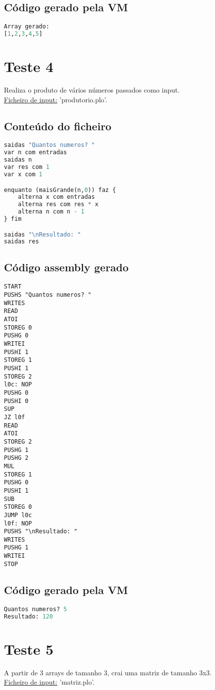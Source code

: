 \documentclass[11pt,a4paper]{report}%
\begin{document}
\subsection{Código gerado pela VM}
\begin{lstlisting}[language=python]
Array gerado:
[1,2,3,4,5]
\end{lstlisting}

\section{Teste 4}
Realiza o produto de vários números passados como input. \\
\underline{Ficheiro de input:} 'produtorio.plo'.

\subsection{Conteúdo do ficheiro}

\begin{lstlisting}[language=python]
saidas "Quantos numeros? "
var n com entradas
saidas n
var res com 1
var x com 1

enquanto (maisGrande(n,0)) faz {
    alterna x com entradas
    alterna res com res * x
    alterna n com n - 1
} fim

saidas "\nResultado: "
saidas res
\end{lstlisting}


\subsection{Código assembly gerado}
\begin{lstlisting}[languague=Assembler]
START
PUSHS "Quantos numeros? "
WRITES
READ
ATOI
STOREG 0
PUSHG 0
WRITEI
PUSHI 1
STOREG 1
PUSHI 1
STOREG 2
l0c: NOP
PUSHG 0
PUSHI 0
SUP
JZ l0f
READ
ATOI
STOREG 2
PUSHG 1
PUSHG 2
MUL
STOREG 1
PUSHG 0
PUSHI 1
SUB
STOREG 0
JUMP l0c
l0f: NOP
PUSHS "\nResultado: "
WRITES
PUSHG 1
WRITEI
STOP   
\end{lstlisting}

\subsection{Código gerado pela VM}
\begin{lstlisting}[language=python]
Quantos numeros? 5
Resultado: 120
\end{lstlisting}

\section{Teste 5}
A partir de 3 arrays de tamanho 3, crai uma matriz de tamanho 3x3. \\
\underline{Ficheiro de input:} 'matriz.plo'.
\end{document}
